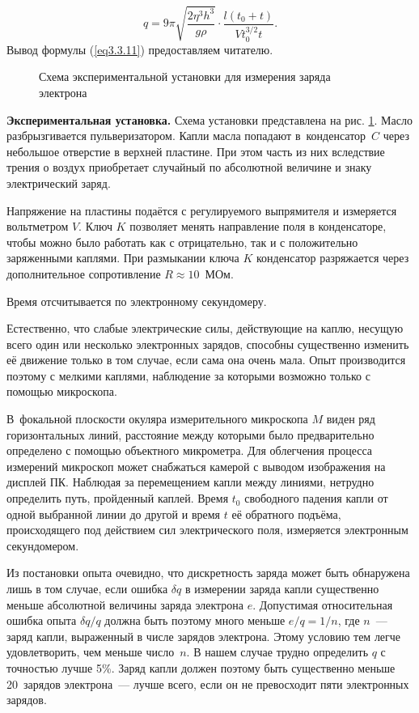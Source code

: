 \begin{equation}
q=9\pi\sqrt{\frac{2\eta^3 h^3}{g \rho}}\cdot\frac{l(t_0+t)}{Vt_0^{3/2} t}.
\label{eq3.3.11}
\end{equation}
Вывод формулы (\ref{eq3.3.11}) предоставляем читателю.

\begin{figure}
\caption{Схема экспериментальной установки для измерения заряда электрона}
\label{fig3.3.1}
\end{figure}

{\bf Экспериментальная установка.} Схема установки представлена на рис. \ref{fig3.3.1}. Масло разбрызгивается пульверизатором. Капли масла попадают в~конденсатор~$C$ через небольшое отверстие в верхней пластине. При этом часть из них вследствие трения о воздух приобретает случайный по абсолютной величине и знаку электрический заряд.

Напряжение на пластины подаётся с регулируемого выпрямителя и измеряется вольтметром $V$. Ключ $K$ позволяет менять
направление поля в конденсаторе, чтобы можно было работать  как с отрицательно, так и с положительно заряженными
каплями. При размыкании ключа $K$ конденсатор разряжается через дополнительное сопротивление $R\approx 10$~МОм.

Время отсчитывается по электронному секундомеру.

Естественно, что слабые электрические силы, действующие на каплю, несущую всего
 один или несколько электронных зарядов, способны существенно изменить её движение только в том случае, если сама она очень мала. Опыт производится поэтому с мелкими каплями, наблюдение за которыми возможно только с помощью микроскопа.

В~фокальной плоскости окуляра измерительного микроскопа $M$ виден ряд горизонтальных линий, расстояние между которыми было предварительно определено с помощью объектного микрометра. Для облегчения процесса измерений микроскоп может снабжаться камерой с выводом изображения на дисплей ПК.  Наблюдая за перемещением капли между линиями, нетрудно определить путь, пройденный каплей. Время $t_0$ свободного падения капли от одной выбранной линии до другой и время $t$ её обратного подъёма, происходящего под действием сил электрического поля, измеряется электронным секундомером.

Из постановки опыта очевидно, что дискретность заряда может быть обнаружена лишь в том случае, если ошибка $\delta q$ в измерении заряда капли существенно меньше абсолютной величины заряда электрона $e$. Допустимая относительная ошибка опыта $\delta q/q$ должна быть поэтому много меньше $e/q=1/n$, где $n$~--- заряд капли, выраженный в числе зарядов электрона. Этому условию тем легче удовлетворить, чем меньше число~$n$. В нашем случае трудно определить $q$ с точностью лучше 5\%. Заряд капли должен поэтому быть существенно меньше 20~зарядов электрона~--- лучше всего, если он не превосходит пяти электронных зарядов.

